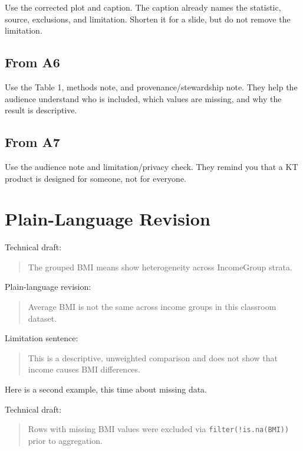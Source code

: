 \documentclass[
  letterpaper,
  DIV=11,
  numbers=noendperiod,
  oneside]{scrreprt}
\begin{document}
Use the corrected plot and caption. The caption already names the
statistic, source, exclusions, and limitation. Shorten it for a slide,
but do not remove the limitation.

\subsection*{From A6}\label{from-a6}

Use the Table 1, methods note, and provenance/stewardship note. They
help the audience understand who is included, which values are missing,
and why the result is descriptive.

\subsection*{From A7}\label{from-a7}

Use the audience note and limitation/privacy check. They remind you that
a KT product is designed for someone, not for everyone.

\section*{Plain-Language Revision}\label{plain-language-revision}


Technical draft:

\begin{quote}
The grouped BMI means show heterogeneity across IncomeGroup strata.
\end{quote}

Plain-language revision:

\begin{quote}
Average BMI is not the same across income groups in this classroom
dataset.
\end{quote}

Limitation sentence:

\begin{quote}
This is a descriptive, unweighted comparison and does not show that
income causes BMI differences.
\end{quote}

Here is a second example, this time about missing data.

Technical draft:

\begin{quote}
Rows with missing BMI values were excluded via
\texttt{filter(!is.na(BMI))} prior to aggregation.
\end{quote}
\end{document}
